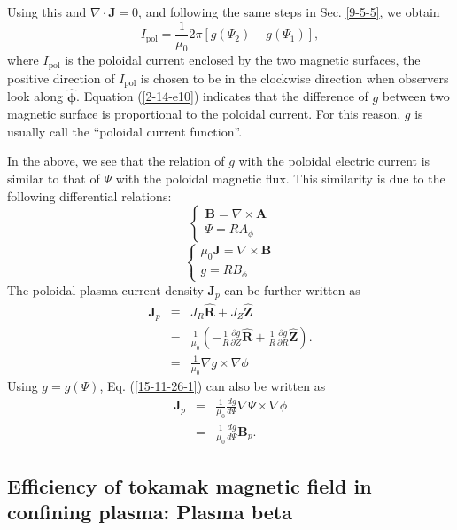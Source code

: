 \documentclass{llncs}
\newcommand{\tmmathbf}[1]{\ensuremath{\boldsymbol{#1}}}
\newcommand{\tmop}[1]{\ensuremath{\operatorname{#1}}}
\begin{document}
Using this and $\nabla \cdot \mathbf{J}= 0$, and following the same steps in
Sec. \ref{9-5-5}, we obtain
\begin{equation}
  \label{2-14-e10} I_{\tmop{pol}} = \frac{1}{\mu_0} 2 \pi [g (\Psi_2) - g
  (\Psi_1)],
\end{equation}
where $I_{\tmop{pol}}$ is the poloidal current enclosed by the two magnetic
surfaces, the positive direction of $I_{\tmop{pol}}$ is chosen to be in the
clockwise direction when observers look along $\hat{\tmmathbf{\phi}}$.
Equation (\ref{2-14-e10}) indicates that the difference of $g$ between two
magnetic surface is proportional to the poloidal current. For this reason, $g$
is usually call the ``poloidal current function''.

In the above, we see that the relation of $g$ with the poloidal electric
current is similar to that of $\Psi$ with the poloidal magnetic flux. This
similarity is due to the following differential relations:
\[ \left\{ \begin{array}{l}
     \mathbf{B}= \nabla \times \mathbf{A}\\
     \Psi = R A_{\phi}
   \end{array} \right. \]
\[ \left\{ \begin{array}{l}
     \mu_0 \mathbf{J}= \nabla \times \mathbf{B}\\
     g = R B_{\phi}
   \end{array} \right. \]
The poloidal plasma current density $\mathbf{J}_p$ can be further written as
\begin{eqnarray}
  \mathbf{J}_p & \equiv & J_R \hat{\mathbf{R}} + J_Z \hat{\mathbf{Z}}
  \nonumber\\
  & = & \frac{1}{\mu_0} \left( - \frac{1}{R}  \frac{\partial g}{\partial Z}
  \hat{\mathbf{R}} + \frac{1}{R} \frac{\partial g}{\partial R}
  \hat{\mathbf{Z}} \right) . \nonumber\\
  & = & \frac{1}{\mu_0} \nabla g \times \nabla \phi  \label{15-11-26-1}
\end{eqnarray}
Using $g = g (\Psi)$, Eq. (\ref{15-11-26-1}) can also be written as
\begin{eqnarray}
  \mathbf{J}_p & = & \frac{1}{\mu_0}  \frac{d g}{d \Psi} \nabla \Psi \times
  \nabla \phi \nonumber\\
  & = & \frac{1}{\mu_0}  \frac{d g}{d \Psi} \mathbf{B}_p . 
\end{eqnarray}
\subsection{Efficiency of tokamak magnetic field in confining plasma: Plasma
beta}\label{2015-5-31-p1}
\end{document}
